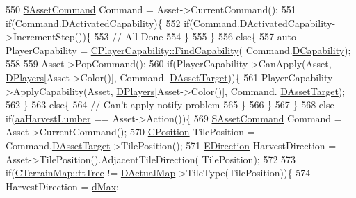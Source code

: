 \begin{DoxyCode}
550             \hyperlink{structSAssetCommand}{SAssetCommand} Command = Asset->CurrentCommand();
551             \textcolor{keywordflow}{if}(Command.\hyperlink{structSAssetCommand_ad8beda19520811cc70fe1eab16c774dd}{DActivatedCapability})\{
552                 \textcolor{keywordflow}{if}(Command.\hyperlink{structSAssetCommand_ad8beda19520811cc70fe1eab16c774dd}{DActivatedCapability}->IncrementStep())\{
553                     \textcolor{comment}{// All Done    }
554                 \}
555             \}
556             \textcolor{keywordflow}{else}\{
557                 \textcolor{keyword}{auto} PlayerCapability = \hyperlink{classCPlayerCapability_a881ba4b87385d7cfe5cb6ced2d26f226}{CPlayerCapability::FindCapability}(
      Command.\hyperlink{structSAssetCommand_a734ea7c6847457b437360f333f570ff9}{DCapability});
558                 
559                 Asset->PopCommand();
560                 \textcolor{keywordflow}{if}(PlayerCapability->CanApply(Asset, \hyperlink{classCGameModel_a524436c3560b10e1c6d6fdd0b66565dc}{DPlayers}[Asset->Color()], Command.
      \hyperlink{structSAssetCommand_a3d9b43f6e59c386c48c41a65448a0c39}{DAssetTarget}))\{
561                     PlayerCapability->ApplyCapability(Asset, \hyperlink{classCGameModel_a524436c3560b10e1c6d6fdd0b66565dc}{DPlayers}[Asset->Color()], Command.
      \hyperlink{structSAssetCommand_a3d9b43f6e59c386c48c41a65448a0c39}{DAssetTarget});
562                 \}
563                 \textcolor{keywordflow}{else}\{
564                     \textcolor{comment}{// Can't apply notify problem   }
565                 \}
566             \}
567         \} 
568         \textcolor{keywordflow}{else} \textcolor{keywordflow}{if}(\hyperlink{GameDataTypes_8h_ab47668e651a3032cfb9c40ea2d60d670a4c44c3d83b3b67a8dd2248d11bedd0ee}{aaHarvestLumber} == Asset->Action())\{
569             \hyperlink{structSAssetCommand}{SAssetCommand} Command = Asset->CurrentCommand();
570             \hyperlink{classCPosition}{CPosition} TilePosition = Command.\hyperlink{structSAssetCommand_a3d9b43f6e59c386c48c41a65448a0c39}{DAssetTarget}->TilePosition();
571             \hyperlink{GameDataTypes_8h_acb2b033915f6659a71a38b5aa6e4eb42}{EDirection} HarvestDirection = Asset->TilePosition().AdjacentTileDirection(
      TilePosition);
572             
573             \textcolor{keywordflow}{if}(\hyperlink{classCTerrainMap_aff2ab991e237269941416dd79d8871d4a15600fc22dc08ff5a3aec20930112f8c}{CTerrainMap::ttTree} != \hyperlink{classCGameModel_ace04c3b62d6b71e20d1ed5460c0c3cee}{DActualMap}->TileType(TilePosition))\{
574                 HarvestDirection = \hyperlink{GameDataTypes_8h_acb2b033915f6659a71a38b5aa6e4eb42af6546049275557ce0ade2ceee042a319}{dMax};

\end{DoxyCode}
